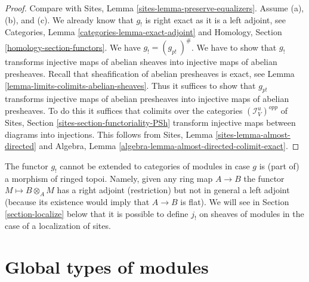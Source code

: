 \begin{proof}
Compare with
Sites, Lemma \ref{sites-lemma-preserve-equalizers}.
Assume (a), (b), and (c).
We already know that $g_!$ is right exact as it is a left adjoint, see
Categories, Lemma \ref{categories-lemma-exact-adjoint} and
Homology, Section \ref{homology-section-functors}.
We have $g_! = (g_{p!}\ )^\#$. We have to show that
$g_!$ transforms injective maps of abelian sheaves into injective maps
of abelian presheaves.
Recall that sheafification of abelian presheaves is exact, see
Lemma \ref{lemma-limits-colimits-abelian-sheaves}.
Thus it suffices to show that $g_{p!}$ transforms injective maps of
abelian presheaves into injective maps of abelian presheaves.
To do this it suffices that colimits over the categories
$(\mathcal{I}_V^u)^{opp}$ of
Sites, Section \ref{sites-section-functoriality-PSh}
transform injective maps between diagrams into injections.
This follows from
Sites, Lemma \ref{sites-lemma-almost-directed}
and
Algebra, Lemma \ref{algebra-lemma-almost-directed-colimit-exact}.
\end{proof}

\begin{remark}
\label{remark-no-extension}
The functor $g_!$ cannot be extended to categories of modules in case
$g$ is (part of) a morphism of ringed topoi. Namely, given any ring map
$A \to B$ the functor $M \mapsto B \otimes_A M$ has a right adjoint
(restriction) but not in general a left adjoint (because its existence
would imply that $A \to B$ is flat). We will see in
Section \ref{section-localize}
below that it is possible to define $j_!$ on sheaves of modules
in the case of a localization of sites.
\end{remark}






\section{Global types of modules}
\label{section-global}

